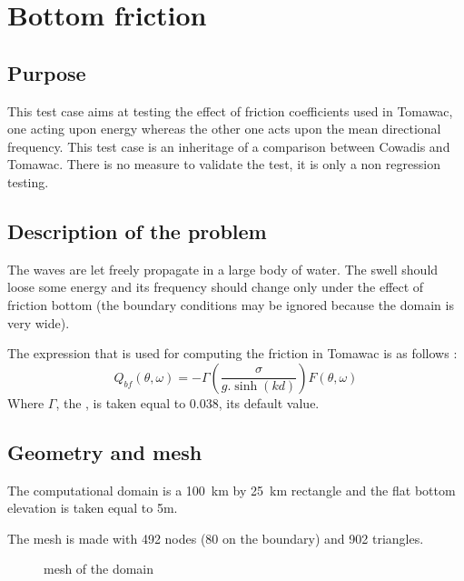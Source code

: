 \section{Bottom friction}
%

%
\subsection{Purpose}
%
This test case aims at testing the effect of friction coefficients used in Tomawac, one acting upon energy whereas the other one acts upon the mean directional frequency. This test case is an inheritage of a comparison between Cowadis and Tomawac. There is no measure to validate the test, it is only a non regression testing.



%
\subsection{Description of the problem}
The waves are let freely propagate in a large body of water. The swell should loose some energy and its frequency should change only under the effect of friction bottom (the boundary conditions may be ignored because the domain is very wide).

The expression that is used for computing the friction in Tomawac is as follows :
\begin{equation}
Q_{bf}(\theta,\omega)=-\Gamma \left(\frac{\sigma}{g.\sinh(kd)}\right)F(\theta,\omega)
\end{equation}
Where $\Gamma$, the , is taken equal to 0.038, its default value.

\subsection{Geometry and mesh}
The computational domain is a 100~km by 25~km rectangle and the flat bottom elevation is taken equal to 5m.

The mesh is made with 492 nodes (80 on the boundary) and 902 triangles.

\begin{figure} [!h]
\centering
{}
 \caption{mesh of the domain}\label{mailbf}
\end{figure}

